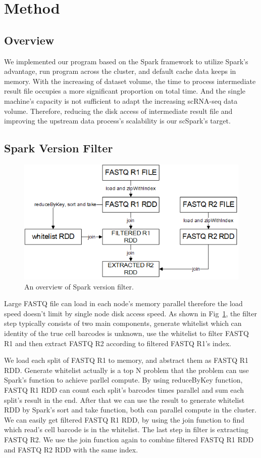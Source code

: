 \documentclass[runningheads]{llncs}
\begin{document}
\section{Method}
\subsection{Overview}
We implemented our program based on the Spark framework to utilize Spark's advantage, run program across the cluster, and default cache data keeps in memory.
With the increasing of dataset volume, the time to process intermediate result file occupies a more significant proportion on total time.
And the single machine's capacity is not sufficient to adapt the increasing scRNA-seq data volume.
Therefore, reducing the disk access of intermediate result file and improving the upstream data process's scalability is our scSpark's target.

\subsection{Spark Version Filter}
\begin{figure}
  \includegraphics[width=\textwidth]{fig1.png}
  \caption{An overview of Spark version filter.} \label{fig1}
\end{figure}  
Large FASTQ file can load in each node's memory parallel therefore the load speed doesn't limit by single node disk access speed.
As shown in Fig~\ref{fig1}, the filter step typically consists of two main components, generate whitelist which can identity of the true cell barcodes is unknown, use the whitelist to filter FASTQ R1 and then extract FASTQ R2 according to filtered FASTQ R1's index.

We load each split of FASTQ R1 to memory, and abstract them as FASTQ R1 RDD.
Generate whitelist actually is a top N problem that the problem can use Spark's function to achieve parllel compute.
By using reduceByKey function, FASTQ R1 RDD can count each split's barcodes times parallel and sum each split's result in the end.
After that we can use the result to generate whitelist RDD by Spark's sort and take function, both can parallel compute in the cluster.
We can easily get filtered FASTQ R1 RDD, by using the join function to find which read's cell barcode is in the whitelist.
The last step in filter is extracting FASTQ R2.
We use the join function again to combine filtered FASTQ R1 RDD and FASTQ R2 RDD with the same index.
\end{document}
